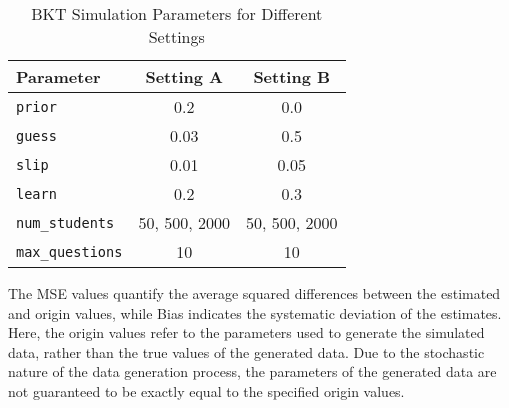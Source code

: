 \documentclass{article}
\begin{document}
\begin{table}[H]
\centering
\caption{BKT Simulation Parameters for Different Settings}
\label{tab:sim_params_3}
\begin{tabular}{@{}lcc@{}}
\toprule
\textbf{Parameter} & \textbf{Setting A} & \textbf{Setting B} \\ 
\midrule
\texttt{prior} & 0.2 & 0.0 \\ 
\texttt{guess} & 0.03 & 0.5 \\ 
\texttt{slip} & 0.01 & 0.05 \\ 
\texttt{learn} & 0.2 & 0.3 \\ 
\texttt{num\_students} & 50, 500, 2000 & 50, 500, 2000 \\ 
\texttt{max\_questions} & 10 & 10 \\ 
\bottomrule
\end{tabular}
\end{table}
    
The MSE values quantify the average squared differences between the estimated and origin values, while Bias indicates the systematic deviation of the estimates. Here, the origin values refer to the parameters used to generate the simulated data, rather than the true values of the generated data. Due to the stochastic nature of the data generation process, the parameters of the generated data are not guaranteed to be exactly equal to the specified origin values.
\end{document}
